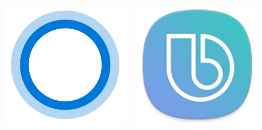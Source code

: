 \documentclass{beamer}
\begin{document}
\begin{frame}
\begin{columns}
\begin{minipage}[c][0.4\textheight][c]{\linewidth}
    \centering
    \includegraphics[width=0.8\linewidth]{cortana}
\end{minipage}
\begin{minipage}[c][0.4\textheight][c]{\linewidth}
    \centering
    \includegraphics[width=0.8\linewidth]{bixby}
\end{minipage}
\begin{minipage}[c][0.4\textheight][c]{\linewidth}
    \centering

\end{minipage}
\end{columns}
\end{frame}
\end{document}
